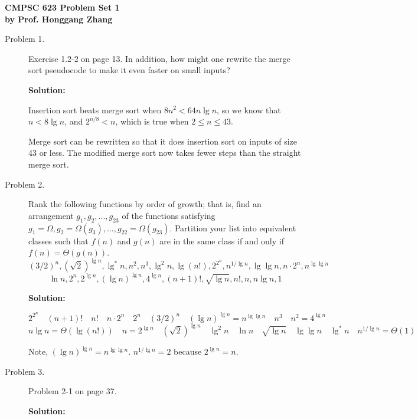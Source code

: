 \documentclass[11pt]{article}
\begin{document}

\begin{center}
{\bf CMPSC 623 Problem Set 1} \\
{\bf by Prof. Honggang Zhang} \\
\end{center}


\begin{description}

\item[Problem 1.]
 Exercise 1.2-2 on page 13. In addition, how might one
rewrite the merge sort pseudocode to make it even faster on small
inputs?

\noindent \textbf{Solution:}

Insertion sort beats merge sort when $8n^2<64n\lg n$, so we know
that $n< 8 \lg n$, and $2^{n/8} < n$, which is true when $2\le n
\le 43$.

Merge sort can be rewritten so that it does insertion sort on
inputs of size 43 or less. The modified merge sort now takes fewer
steps than the straight merge sort.

\item[Problem 2.] Rank the following functions by order of growth; that is,
find an arrangement $g_1, g_2, ..., g_{23}$ of the functions
satisfying $g_1=\Omega, g_2=\Omega(g_3), ...,
g_{22}=\Omega(g_{23})$. Partition your list into equivalent
classes such that $f(n)$ and $g(n)$ are in the same class if and
only if $f(n)=\Theta(g(n))$.
$$(3/2)^n, (\sqrt{2})^{\lg n}, \lg^*n, n^2, n^3, \lg^2n,
\lg (n!), 2^{2^n}, n^{1/\lg n}, \lg \lg n, n\cdot 2^n, n^{\lg \lg
n}
$$
$$
\ln n, 2^n, 2^{\lg n}, (\lg n)^{\lg n}, 4^{\lg n}, (n+1)!,
\sqrt{\lg n}, n!,  n, n\lg n, 1
$$

\noindent \textbf{Solution:}

$$
2^{2^n} \quad (n+1)! \quad n! \quad n\cdot 2^n \quad 2^n \quad
(3/2)^n \quad (\lg n)^{\lg n}=n^{\lg \lg n} \quad n^3 \quad
n^2=4^{\lg n} \quad
$$
$$
n\lg n =\Theta(\lg (n!)) \quad n=2^{\lg n} \quad (\sqrt{2})^{\lg
n} \quad \lg^2n \quad \ln n \quad \sqrt{\lg n} \quad \lg \lg n
\quad \lg^*n \quad n^{1/\lg n}= \Theta(1)
$$

Note, $(\lg n)^{\lg n}=n^{\lg \lg n}$. $n^{1/\lg n}=2$ because
$2^{\lg n}=n$.

\item[Problem 3.] Problem 2-1 on page 37.

\noindent \textbf{Solution:}


\end{description}
\end{document}
